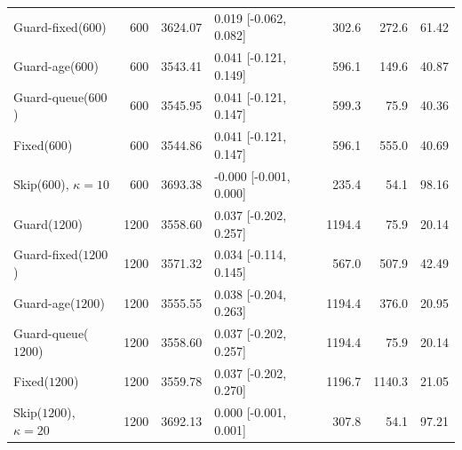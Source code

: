 \documentclass[mathematics,supfile,submit,moreauthors]{Definitions/mdpi}
\newcommand{\sealednum}[1]{#1}
\begin{document}
\begin{table}[htbp]
\begin{tabular}{lrrlrrr}
Guard-fixed($\sealednum{600}$)  & \sealednum{600} & \sealednum{3624.07} & \sealednum{0.019 [-0.062, 0.082]} & \sealednum{302.6} & \sealednum{272.6} & \sealednum{61.42} \\
Guard-age($\sealednum{600}$)    & \sealednum{600} & \sealednum{3543.41} & \sealednum{0.041 [-0.121, 0.149]} & \sealednum{596.1} & \sealednum{149.6} & \sealednum{40.87} \\
Guard-queue($\sealednum{600}$)  & \sealednum{600} & \sealednum{3545.95} & \sealednum{0.041 [-0.121, 0.147]} & \sealednum{599.3} & \sealednum{75.9} & \sealednum{40.36} \\
Fixed($\sealednum{600}$)        & \sealednum{600} & \sealednum{3544.86} & \sealednum{0.041 [-0.121, 0.147]} & \sealednum{596.1} & \sealednum{555.0} & \sealednum{40.69} \\
Skip($\sealednum{600}$), $\kappa=10$ & \sealednum{600} & \sealednum{3693.38} & \sealednum{-0.000 [-0.001, 0.000]} & \sealednum{235.4} & \sealednum{54.1} & \sealednum{98.16} \\
Guard($\sealednum{1200}$)       & \sealednum{1200} & \sealednum{3558.60} & \sealednum{0.037 [-0.202, 0.257]} & \sealednum{1194.4} & \sealednum{75.9} & \sealednum{20.14} \\
Guard-fixed($\sealednum{1200}$) & \sealednum{1200} & \sealednum{3571.32} & \sealednum{0.034 [-0.114, 0.145]} & \sealednum{567.0} & \sealednum{507.9} & \sealednum{42.49} \\
Guard-age($\sealednum{1200}$)   & \sealednum{1200} & \sealednum{3555.55} & \sealednum{0.038 [-0.204, 0.263]} & \sealednum{1194.4} & \sealednum{376.0} & \sealednum{20.95} \\
Guard-queue($\sealednum{1200}$) & \sealednum{1200} & \sealednum{3558.60} & \sealednum{0.037 [-0.202, 0.257]} & \sealednum{1194.4} & \sealednum{75.9} & \sealednum{20.14} \\
Fixed($\sealednum{1200}$)       & \sealednum{1200} & \sealednum{3559.78} & \sealednum{0.037 [-0.202, 0.270]} & \sealednum{1196.7} & \sealednum{1140.3} & \sealednum{21.05} \\
Skip($\sealednum{1200}$), $\kappa=20$ & \sealednum{1200} & \sealednum{3692.13} & \sealednum{0.000 [-0.001, 0.001]} & \sealednum{307.8} & \sealednum{54.1} & \sealednum{97.21} \\
\bottomrule
\end{tabular}
\end{table}
\end{document}

